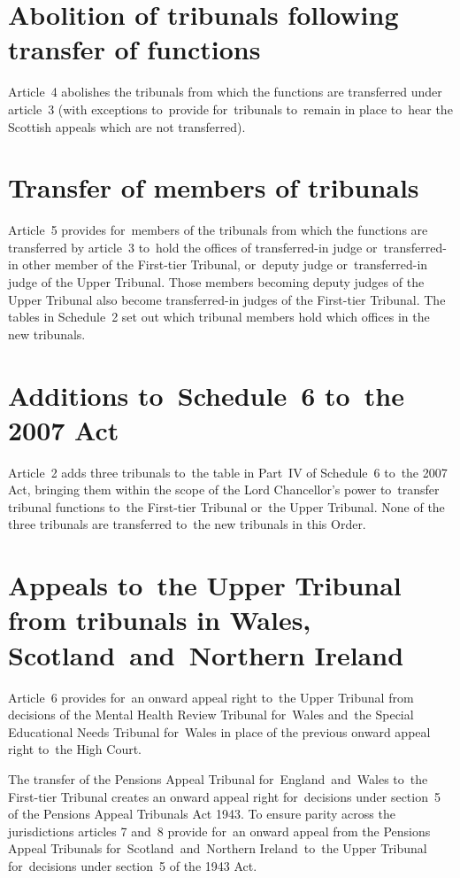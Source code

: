 \documentclass[12pt,a4paper]{article}
\begin{document}
\section*{\sloppy Abolition of tribunals following transfer of functions}

Article~4 abolishes the tribunals from which the functions are transferred under article~3 (with exceptions to~provide for~tribunals to~remain in place to~hear the Scottish appeals which are not transferred).

\section*{Transfer of members of tribunals}

Article~5 provides for~members of the tribunals from which the functions are transferred by article~3 to~hold the offices of transferred-in judge or~transferred-in other member of the First-tier Tribunal, or~deputy judge or~transferred-in judge of the Upper Tribunal. Those members becoming deputy judges of the Upper Tribunal also become transferred-in judges of the First-tier Tribunal. The tables in Schedule~2 set out which tribunal members hold which offices in the new tribunals.

\section*{Additions to~Schedule~6 to~the 2007 Act}

Article~2 adds three tribunals to~the table in Part~IV of Schedule~6 to~the 2007 Act, bringing them within the scope of the Lord Chancellor’s power to~transfer tribunal functions to~the First-tier Tribunal or~the Upper Tribunal. None of the three tribunals are transferred to~the new tribunals in this Order.

\section*{Appeals to~the Upper Tribunal from tribunals in Wales, Scotland~and~Northern Ireland}

Article~6 provides for~an onward appeal right to~the Upper Tribunal from decisions of the Mental Health Review Tribunal for~Wales and~the Special Educational Needs Tribunal for~Wales in place of the previous onward appeal right to~the High Court.

The transfer of the Pensions Appeal Tribunal for~England~and~Wales to~the First-tier Tribunal creates an onward appeal right for~decisions under section~5 of the Pensions Appeal Tribunals Act 1943. To ensure parity across the jurisdictions articles 7 and~8 provide for~an onward appeal from the Pensions Appeal Tribunals for~Scotland~and~Northern Ireland~to~the Upper Tribunal for~decisions under section~5 of the 1943 Act.
\end{document}
